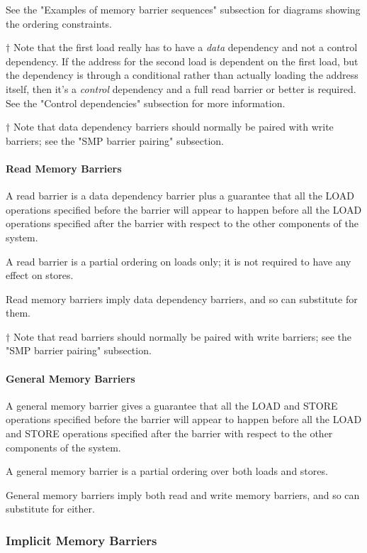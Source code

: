 See the "Examples of memory barrier sequences" subsection for diagrams
showing the ordering constraints.

$\dagger$ Note that the first load really has to have a
\emph{data} dependency and
not a control dependency.  If the address for the second load is dependent
on the first load, but the dependency is through a conditional rather than
actually loading the address itself, then it's a \emph{control} dependency and
a full read barrier or better is required.  See the "Control dependencies"
subsection for more information.

$\dagger$ Note that data dependency barriers should normally be paired with
write barriers; see the "SMP barrier pairing" subsection.

\paragraph{Read Memory Barriers}

A read barrier is a data dependency barrier plus a guarantee that all the
LOAD operations specified before the barrier will appear to happen before
all the LOAD operations specified after the barrier with respect to the
other components of the system.

A read barrier is a partial ordering on loads only; it is not required to
have any effect on stores.

Read memory barriers imply data dependency barriers, and so can substitute
for them.

$\dagger$ Note that read barriers should normally be paired with write barriers;
see the "SMP barrier pairing" subsection.

\paragraph{General Memory Barriers}

A general memory barrier gives a guarantee that all the LOAD and STORE
operations specified before the barrier will appear to happen before all
the LOAD and STORE operations specified after the barrier with respect to
the other components of the system.

A general memory barrier is a partial ordering over both loads and stores.

General memory barriers imply both read and write memory barriers, and so
can substitute for either.

\subsubsection{Implicit Memory Barriers}

